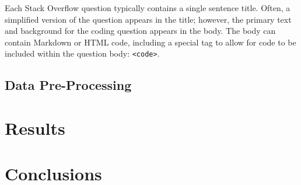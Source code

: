 \documentclass{article}
\begin{document}
Each Stack Overflow question typically contains a single sentence title. 
Often, a simplified version of the question appears in the title; however,
the primary text and background for the coding question appears in the body.
The body can contain Markdown or HTML code, including a special tag to allow
for code to be included within the question body: {\tt <code>}. 

\subsection{Data Pre-Processing}


\section{Results}

\section{Conclusions}

 
\end{document}
